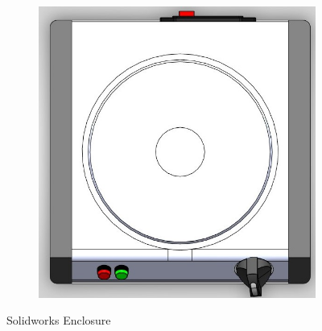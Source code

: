 \begin{figure}[h]
\begin{subfigure}{0.475\textwidth}
        \end{subfigure}
        \hfill
        \begin{subfigure}{0.475\textwidth}   
            \centering 
            \includegraphics[width=\textwidth]{Enclosure/e37a053d-cc5b-4a5f-88a6-e2852106d6c8.JPG}
            
        \end{subfigure}
        \caption[ The average and standard deviation of critical parameters ]
        {\small Solidworks Enclosure} 
        \label{fig:mean and std of nets}
    \end{figure}

